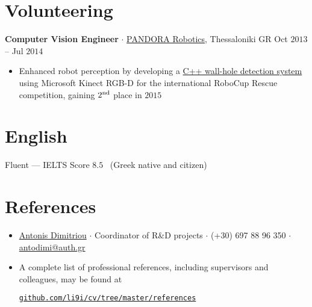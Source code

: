 \documentclass[a4paper,10pt,twoside]{article}
\newcommand{\verticalspacebetweensections}{\vspace{0em}}
\newcommand{\verticalspacebetweensectionandcontent}{\vspace{0.4em}}
\newcommand{\verticalspaceafteritem}{\vspace{-0.8em}}
\begin{document}
\section{\textbf{Volunteering}}\verticalspacebetweensectionandcontent

\noindent \textbf{Computer Vision Engineer} $\cdot$ \href{https://issel.ee.auth.gr/pandora-robotics/}{PANDORA Robotics}, Thessaloniki GR \hfill {\small \textcolor{datecolour}{Oct $2013$ -- Jul $2014$}}
  \begin{minipage}[t]{\textwidth}
    \begin{itemize}
      \item Enhanced robot perception by developing a \href{https://github.com/li9i/pandora\_vision\_2014}{C++ wall-hole detection system} using Microsoft Kinect RGB-D for the international RoboCup Rescue competition, gaining $2^{\textnormal{nd}}$ place in $2015$
    \end{itemize}
  \end{minipage}
\verticalspacebetweensections

\section{\textbf{English}}\verticalspacebetweensectionandcontent
Fluent --- IELTS Score $8.5$ \ (Greek native and citizen)
\verticalspacebetweensections

\section{\textbf{References}}\verticalspacebetweensectionandcontent
\begin{itemize}
  \item \href{https://gr.linkedin.com/in/antonis-dimitriou-21003452}{Antonis Dimitriou} $\cdot$ Coordinator of R\&D projects $\cdot$ (+30) 697 88 96 350 $\cdot$ \href{mailto:antodimi@auth.gr}{antodimi@auth.gr} \verticalspaceafteritem

\item A complete list of professional references, including supervisors and colleagues, may be found at\verticalspaceafteritem\vspace{0.5em}
\begin{center}\noindent
\href{https://mozilla.github.io/pdf.js/web/viewer.html?file=https://raw.githubusercontent.com/li9i/cv/master/references/references_alexandros_filotheou.pdf}{\texttt{github.com/li9i/cv/tree/master/references}}
\end{center}
\end{itemize}
\end{document}

